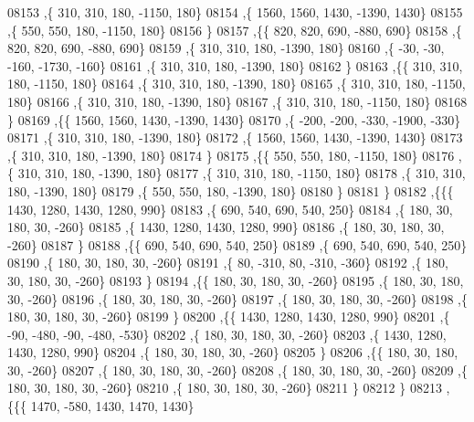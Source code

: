 \begin{DoxyCode}
08153     ,\{   310,   310,   180, -1150,   180\}
08154     ,\{  1560,  1560,  1430, -1390,  1430\}
08155     ,\{   550,   550,   180, -1150,   180\}
08156     \}
08157    ,\{\{   820,   820,   690,  -880,   690\}
08158     ,\{   820,   820,   690,  -880,   690\}
08159     ,\{   310,   310,   180, -1390,   180\}
08160     ,\{   -30,   -30,  -160, -1730,  -160\}
08161     ,\{   310,   310,   180, -1390,   180\}
08162     \}
08163    ,\{\{   310,   310,   180, -1150,   180\}
08164     ,\{   310,   310,   180, -1390,   180\}
08165     ,\{   310,   310,   180, -1150,   180\}
08166     ,\{   310,   310,   180, -1390,   180\}
08167     ,\{   310,   310,   180, -1150,   180\}
08168     \}
08169    ,\{\{  1560,  1560,  1430, -1390,  1430\}
08170     ,\{  -200,  -200,  -330, -1900,  -330\}
08171     ,\{   310,   310,   180, -1390,   180\}
08172     ,\{  1560,  1560,  1430, -1390,  1430\}
08173     ,\{   310,   310,   180, -1390,   180\}
08174     \}
08175    ,\{\{   550,   550,   180, -1150,   180\}
08176     ,\{   310,   310,   180, -1390,   180\}
08177     ,\{   310,   310,   180, -1150,   180\}
08178     ,\{   310,   310,   180, -1390,   180\}
08179     ,\{   550,   550,   180, -1390,   180\}
08180     \}
08181    \}
08182   ,\{\{\{  1430,  1280,  1430,  1280,   990\}
08183     ,\{   690,   540,   690,   540,   250\}
08184     ,\{   180,    30,   180,    30,  -260\}
08185     ,\{  1430,  1280,  1430,  1280,   990\}
08186     ,\{   180,    30,   180,    30,  -260\}
08187     \}
08188    ,\{\{   690,   540,   690,   540,   250\}
08189     ,\{   690,   540,   690,   540,   250\}
08190     ,\{   180,    30,   180,    30,  -260\}
08191     ,\{    80,  -310,    80,  -310,  -360\}
08192     ,\{   180,    30,   180,    30,  -260\}
08193     \}
08194    ,\{\{   180,    30,   180,    30,  -260\}
08195     ,\{   180,    30,   180,    30,  -260\}
08196     ,\{   180,    30,   180,    30,  -260\}
08197     ,\{   180,    30,   180,    30,  -260\}
08198     ,\{   180,    30,   180,    30,  -260\}
08199     \}
08200    ,\{\{  1430,  1280,  1430,  1280,   990\}
08201     ,\{   -90,  -480,   -90,  -480,  -530\}
08202     ,\{   180,    30,   180,    30,  -260\}
08203     ,\{  1430,  1280,  1430,  1280,   990\}
08204     ,\{   180,    30,   180,    30,  -260\}
08205     \}
08206    ,\{\{   180,    30,   180,    30,  -260\}
08207     ,\{   180,    30,   180,    30,  -260\}
08208     ,\{   180,    30,   180,    30,  -260\}
08209     ,\{   180,    30,   180,    30,  -260\}
08210     ,\{   180,    30,   180,    30,  -260\}
08211     \}
08212    \}
08213   ,\{\{\{  1470,  -580,  1430,  1470,  1430\}

\end{DoxyCode}
